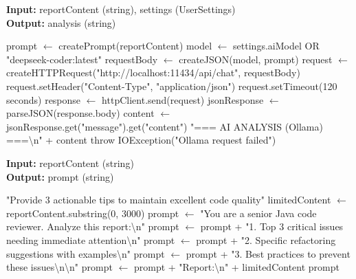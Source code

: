 \documentclass[12pt,a4paper]{article}
\begin{document}
    \begin{algorithm}[H]
        \caption{analyzeWithOllama}
        \textbf{Input:} reportContent (string), settings (UserSettings)\\
        \textbf{Output:} analysis (string)
        \begin{algorithmic}[1]
            \State prompt $\gets$ createPrompt(reportContent)
            \State model $\gets$ settings.aiModel OR "deepseek-coder:latest"
            \State requestBody $\gets$ createJSON(model, prompt)
            \State request $\gets$ createHTTPRequest("http://localhost:11434/api/chat", requestBody)
            \State request.setHeader("Content-Type", "application/json")
            \State request.setTimeout(120 seconds)
            \State response $\gets$ httpClient.send(request)
                \State jsonResponse $\gets$ parseJSON(response.body)
                \State content $\gets$ jsonResponse.get("message").get("content")
                \Return "=== AI ANALYSIS (Ollama) ===\textbackslash n" + content
            \Else
                \State throw IOException("Ollama request failed")
            \EndIf
        \end{algorithmic}
    \end{algorithm}

    \begin{algorithm}[H]
        \caption{createPrompt}
        \textbf{Input:} reportContent (string)\\
        \textbf{Output:} prompt (string)
        \begin{algorithmic}[1]
                \Return "Provide 3 actionable tips to maintain excellent code quality"
            \EndIf
            \State limitedContent $\gets$ reportContent.substring(0, 3000)
            \State prompt $\gets$ "You are a senior Java code reviewer. Analyze this report:\textbackslash n"
            \State prompt $\gets$ prompt + "1. Top 3 critical issues needing immediate attention\textbackslash n"
            \State prompt $\gets$ prompt + "2. Specific refactoring suggestions with examples\textbackslash n"
            \State prompt $\gets$ prompt + "3. Best practices to prevent these issues\textbackslash n\textbackslash n"
            \State prompt $\gets$ prompt + "Report:\textbackslash n" + limitedContent
            \Return prompt
        \end{algorithmic}
    \end{algorithm}
\end{document}
